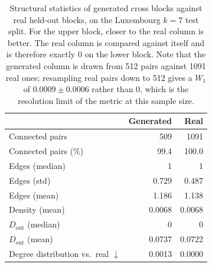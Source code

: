 \begin{table}[H]
\centering
\caption{Structural statistics of generated cross blocks against real held-out
blocks, on the Luxembourg $k{=}7$ test split. For the upper block, closer to
the real column is better. The real column is compared against
itself and is therefore exactly $0$ on the lower block. Note that the generated
column is drawn from 512 pairs against 1091 real ones; resampling real
pairs down to 512 gives a $W_1$ of $0.0009 \pm 0.0006$
rather than $0$, which is the resolution limit of the metric at this sample
size.}\label{tab:dinter-stats-simple}
\begin{tabular}{lrr}
\toprule
& Generated & Real \\
\midrule
Connected pairs                           & 509 & 1091 \\
Connected pairs (\%)                      & 99.4 & 100.0 \\
Edges (median)                            & 1 & 1 \\
Edges (std)                               & 0.729 & 0.487 \\
Edges (mean)                              & 1.186 & 1.138 \\
Density (mean)                            & 0.0068 & 0.0068 \\
$D_{\mathrm{out}}$ (median)               & 0 & 0 \\
$D_{\mathrm{out}}$ (mean)                 & 0.0737 & 0.0722 \\
\midrule
Degree distribution vs.\ real $\downarrow$ & 0.0013 & 0.0000 \\
\bottomrule
\end{tabular}
\end{table}
